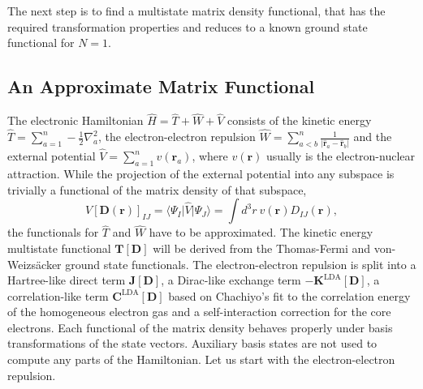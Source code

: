 \documentclass[journal=jpclcd,manuscript=letter]{achemso}
\newcommand\m[1]{\mathbf{#1}}
\renewcommand\vec[1]{\mathbf{#1}}
\begin{document}
The next step is to find a multistate matrix density functional, that has the required transformation properties
 and reduces to a known ground state functional for $N=1$.

\subsection{An Approximate Matrix Functional}
\label{sec:approximate_lda_msdft}
The electronic Hamiltonian $\hat{H} = \hat{T} + \hat{W} + \hat{V}$ consists of
the kinetic energy $\hat{T} = \sum_{a=1}^{n} -\frac{1}{2} \nabla^2_a$,
the electron-electron repulsion $\hat{W} = \sum_{a < b}^{n} \frac{1}{\vert \hat{\vec{r}}_a - \hat{\vec{r}}_b \vert}$
and the external potential $\hat{V} = \sum_{a=1}^{n} v(\vec{r}_a)$, where $v(\vec{r})$ usually is the electron-nuclear attraction.
While the projection of the external potential into any subspace is trivially a functional of the matrix density of that subspace,
\begin{equation}
 V[\m{D}(\vec{r})]_{IJ} = \langle \Psi_I \vert \hat{V} \vert \Psi_J \rangle = \int d^3r ~ v(\vec{r}) D_{IJ}(\vec{r}),
\end{equation}
the functionals for $\hat{T}$ and $\hat{W}$ have to be approximated. The kinetic energy multistate functional $\m{T}[\m{D}]$
will be derived from the Thomas-Fermi and von-Weizs\"{a}cker ground state functionals. The electron-electron repulsion
is split into a Hartree-like direct term $\m{J}[\m{D}]$, a Dirac-like exchange term $-\m{K}^{\text{LDA}}[\m{D}]$,
a correlation-like term $\m{C}^{\text{LDA}}[\m{D}]$ based on Chachiyo's fit to
the correlation energy of the homogeneous electron gas and a self-interaction correction for the core electrons.
Each functional of the matrix density behaves properly under basis transformations of the state vectors.
Auxiliary basis states are not used to compute any parts of the Hamiltonian.
Let us start with the electron-electron repulsion.
\end{document}
